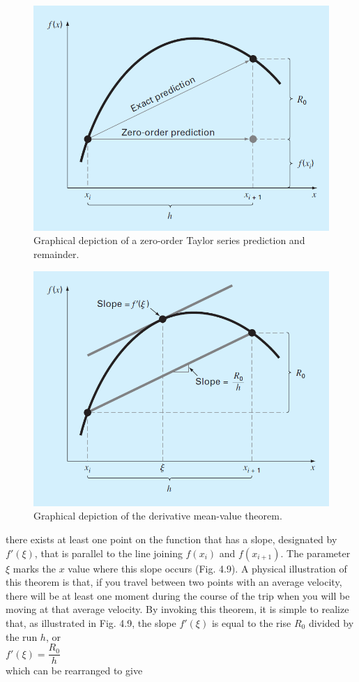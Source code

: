 \documentclass[../main.tex]{subfiles}
\begin{document}
\begin{figure}[h]
    \includegraphics[width=0.55\linewidth]{./images/fig_4_8}
    \caption{Graphical depiction of a zero-order Taylor series prediction and remainder.\hfill}
\end{figure}

\begin{figure}[h]
    \includegraphics[width=0.55\linewidth]{./images/fig_4_9}
    \caption{Graphical depiction of the derivative mean-value theorem.}
\end{figure}
\newpage

\noindent
there exists at least one point on the function that has a slope, designated by $f'(\xi)$, that is
parallel to the line joining $f(x_i)$ and $f(x_{i+1})$. The parameter $\xi$ marks the $x$ value where this
slope occurs (Fig. 4.9). A physical illustration of this theorem is that, if you travel between
two points with an average velocity, there will be at least one moment during the course of
the trip when you will be moving at that average velocity.
By invoking this theorem, it is simple to realize that, as illustrated in Fig. 4.9, the slope
$f'(\xi)$ is equal to the rise $R_0$ divided by the run $h$, or\\

$f'(\xi)=\dfrac{R_0}{h}$\\

\noindent
which can be rearranged to give\\
\end{document}
